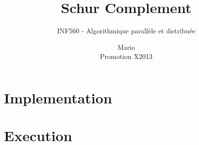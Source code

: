 \documentclass[a4paper,12pt,oneside]{article}
\title{Schur Complement}
\subtitle{INF560 - Algorithmique parallèle et distribuée}
\author{Mario \bsc{Ynocente Castro} \\ Promotion X2013}
\begin{document}
\maketitle

\section{Implementation}


\section{Execution}
\end{document}
